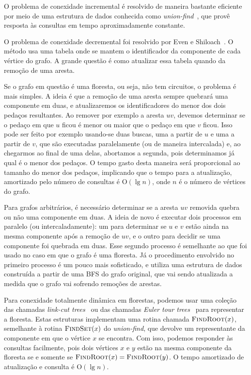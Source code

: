 \documentclass[12pt]{article}
\newcommand{\Oh}{\mathrm{O}}
\begin{document}
O problema de conexidade incremental é resolvido de maneira bastante eficiente por meio de 
uma estrutura de dados conhecida como \emph{union-find}~\cite{Tarjan1975}, que provê resposta 
às consultas em tempo aproximadamente constante. 

O problema de conexidade decremental foi resolvido por Even e Shiloach~\cite{EvenS1981}.  
O método usa uma tabela onde se mantem o identificador da componente de cada vértice do grafo.  
A grande questão é como atualizar essa tabela quando da remoção de uma aresta. 

Se o grafo em questão é uma floresta, ou seja, não tem circuitos, o problema é mais simples.  
A ideia é que a remoção de uma aresta sempre quebrará uma componente em duas, e atualizaremos
os identificadores do menor dos dois pedaços resultantes.  Ao remover por exemplo a aresta $uv$, 
devemos determinar se o pedaço em que $u$ ficou é menor ou maior que o pedaço em que $v$ ficou.  
Isso pode ser feito por exemplo usando-se duas buscas, uma a partir de $u$ e uma a partir de $v$, 
que são executadas paralelamente (ou de maneira intercalada) e, ao chegarmos ao final de uma delas, 
abortamos a segunda, pois determinamos já qual é o menor dos pedaços.  O tempo gasto desta maneira 
será proporcional ao tamanho do menor dos pedaços, implicando que o tempo para a atualização, 
amortizado pelo número de consultas é $\Oh(\lg n)$, onde $n$ é o número de vértices do grafo.

Para grafos arbitrários, é necessário determinar se a aresta $uv$ removida quebra ou não uma 
componente em duas.  A ideia de novo é executar dois processos em paralelo (ou intercaladamente): 
um para determinar se $u$ e $v$ estão ainda na mesma componente após a remoção de $uv$, e o
outro para decidir se uma componente foi quebrada em duas.  Esse segundo processo é semelhante
ao que foi usado no caso em que o grafo é uma floresta.  Já o procedimento envolvido no 
primeiro processo é um pouco mais sofisticado, e utiliza uma estrutura de dados construída 
a partir de uma BFS do grafo original, que vai sendo atualizada a medida que o grafo vai 
sofrendo remoções de arestas. 

\newcommand{\FindRoot}{\mbox{\sc FindRoot}}
\newcommand{\FindSet}{\mbox{\sc FindSet}}

Para conexidade totalmente dinâmica em florestas, 
podemos usar uma coleção das chamadas \emph{link-cut trees}~\cite{SleatorT1983} ou 
das chamadas \emph{Euler tour trees}~\cite{HenzingerK1995} para representar a floresta.  
Estas estruturas implementam uma rotina chamada $\FindRoot(x)$, 
semelhante à rotina $\FindSet(x)$ do \emph{union-find}, que devolve 
um representante da componente em que o vértice $x$ se encontra. 
Com isso, podemos responder às consultas facilmente, pois dois vértices $x$ e $y$ 
estão na mesma componente da floresta se e somente se $\FindRoot(x) = \FindRoot(y)$.
O tempo amortizado de atualização e consulta é $\Oh(\lg n)$.
\end{document}

